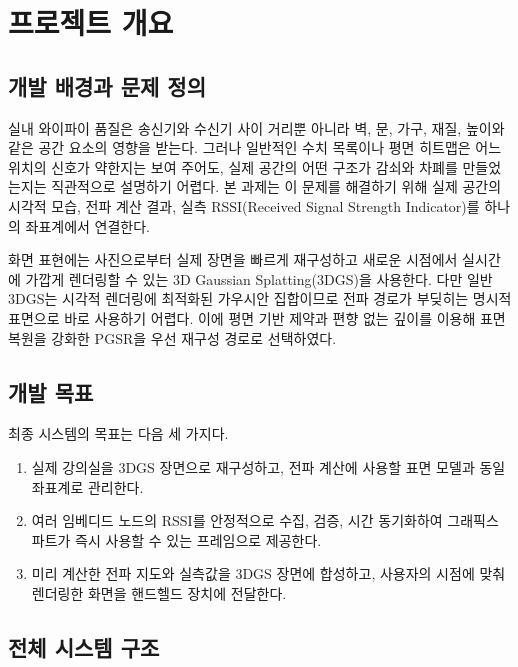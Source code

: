 \documentclass[titlepage]{pnureport}
\begin{document}
\clearpage
{}

\chapter{프로젝트 개요}

\section{개발 배경과 문제 정의}

실내 와이파이 품질은 송신기와 수신기 사이 거리뿐 아니라 벽, 문, 가구, 재질, 높이와 같은 공간 요소의 영향을 받는다. 그러나 일반적인 수치 목록이나 평면 히트맵은 어느 위치의 신호가 약한지는 보여 주어도, 실제 공간의 어떤 구조가 감쇠와 차폐를 만들었는지는 직관적으로 설명하기 어렵다. 본 과제는 이 문제를 해결하기 위해 실제 공간의 시각적 모습, 전파 계산 결과, 실측 RSSI(Received Signal Strength Indicator)를 하나의 좌표계에서 연결한다.

화면 표현에는 사진으로부터 실제 장면을 빠르게 재구성하고 새로운 시점에서 실시간에 가깝게 렌더링할 수 있는 3D Gaussian Splatting(3DGS)을 사용한다\cite{kerbl2023}. 다만 일반 3DGS는 시각적 렌더링에 최적화된 가우시안 집합이므로 전파 경로가 부딪히는 명시적 표면으로 바로 사용하기 어렵다. 이에 평면 기반 제약과 편향 없는 깊이를 이용해 표면 복원을 강화한 PGSR을 우선 재구성 경로로 선택하였다\cite{chen2024pgsr}.

\section{개발 목표}

최종 시스템의 목표는 다음 세 가지다.

\begin{enumerate}
  \item 실제 강의실을 3DGS 장면으로 재구성하고, 전파 계산에 사용할 표면 모델과 동일 좌표계로 관리한다.
  \item 여러 임베디드 노드의 RSSI를 안정적으로 수집, 검증, 시간 동기화하여 그래픽스 파트가 즉시 사용할 수 있는 프레임으로 제공한다.
  \item 미리 계산한 전파 지도와 실측값을 3DGS 장면에 합성하고, 사용자의 시점에 맞춰 렌더링한 화면을 핸드헬드 장치에 전달한다.
\end{enumerate}

\section{전체 시스템 구조}
\end{document}
